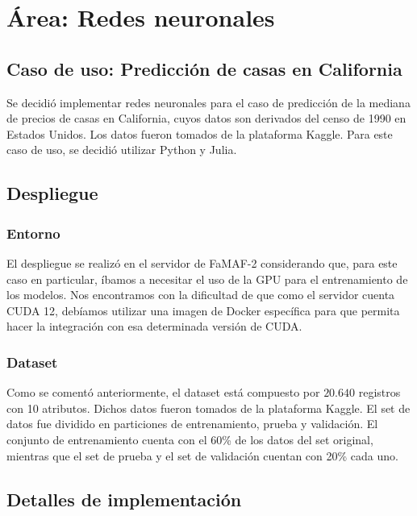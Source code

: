\documentclass[11pt]{article}
\let\Oldsection\section
\renewcommand{\section}{\FloatBarrier\Oldsection}
\let\Oldsubsection\subsection
\renewcommand{\subsection}{\FloatBarrier\Oldsubsection}
\let\Oldsubsubsection\subsubsection
\renewcommand{\subsubsection}{\FloatBarrier\Oldsubsubsection}
\begin{document}
\newpage

\section{Área: Redes neuronales}

\subsection{Caso de uso: Predicción de casas en California}

Se decidió implementar redes neuronales para el caso de predicción de la mediana de precios de casas en California, cuyos datos son derivados del censo de 1990 en Estados Unidos. Los datos fueron tomados de la plataforma Kaggle. Para este caso de uso, se decidió utilizar Python y Julia.

\subsection{Despliegue}

\subsubsection{Entorno}

El despliegue se realizó en el servidor de FaMAF-2 considerando que, para este caso en particular, íbamos a necesitar el uso de la GPU para el entrenamiento de los modelos. Nos encontramos con la dificultad de que como el servidor cuenta CUDA 12, debíamos utilizar una imagen de Docker específica para que permita hacer la integración con esa determinada versión de CUDA.

\subsubsection{Dataset}

Como se comentó anteriormente, el dataset está compuesto por $20.640$ registros con 10 atributos. Dichos datos fueron tomados de la plataforma Kaggle. 
El set de datos fue dividido en particiones de entrenamiento, prueba y validación. El conjunto de entrenamiento cuenta con el 60\% de los datos del set original, mientras que el set de prueba y el set de validación cuentan con 20\% cada uno.

\subsection{Detalles de implementación}
\end{document}
